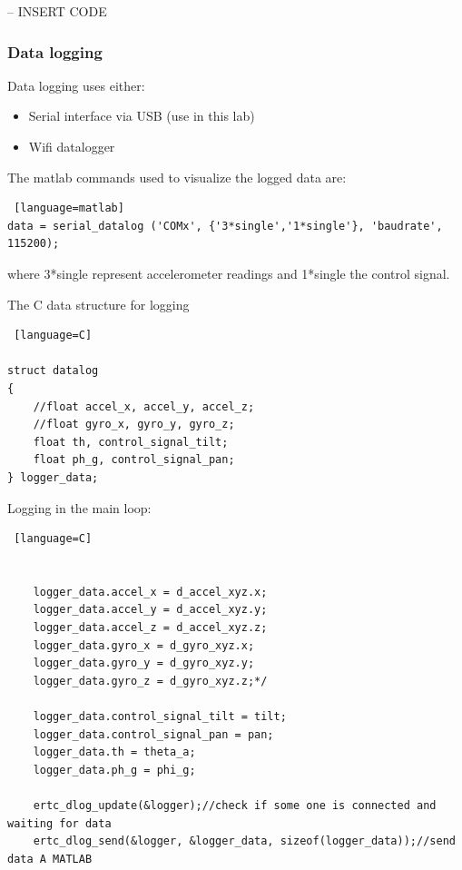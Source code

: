 -- INSERT CODE





\subsubsection{Data logging}

Data logging uses either:

\begin{itemize}
    \item Serial interface via USB (use in this lab)
    \item Wifi datalogger 
\end{itemize}


The matlab commands used to visualize the logged data are:

\begin{lstlisting} [language=matlab]
data = serial_datalog ('COMx', {'3*single','1*single'}, 'baudrate', 115200);
\end{lstlisting}

where 3*single represent accelerometer readings and 1*single the control signal.


The C data structure for logging

\begin{lstlisting} [language=C]

struct datalog
{
    //float accel_x, accel_y, accel_z;
    //float gyro_x, gyro_y, gyro_z;
    float th, control_signal_tilt;
    float ph_g, control_signal_pan;
} logger_data;

\end{lstlisting}

Logging in the main loop:

\begin{lstlisting} [language=C]


    logger_data.accel_x = d_accel_xyz.x;
    logger_data.accel_y = d_accel_xyz.y;
    logger_data.accel_z = d_accel_xyz.z;
    logger_data.gyro_x = d_gyro_xyz.x;
    logger_data.gyro_y = d_gyro_xyz.y;
    logger_data.gyro_z = d_gyro_xyz.z;*/
    
    logger_data.control_signal_tilt = tilt;
    logger_data.control_signal_pan = pan;
    logger_data.th = theta_a;
    logger_data.ph_g = phi_g;
    
    ertc_dlog_update(&logger);//check if some one is connected and waiting for data
    ertc_dlog_send(&logger, &logger_data, sizeof(logger_data));//send data A MATLAB

\end{lstlisting}


